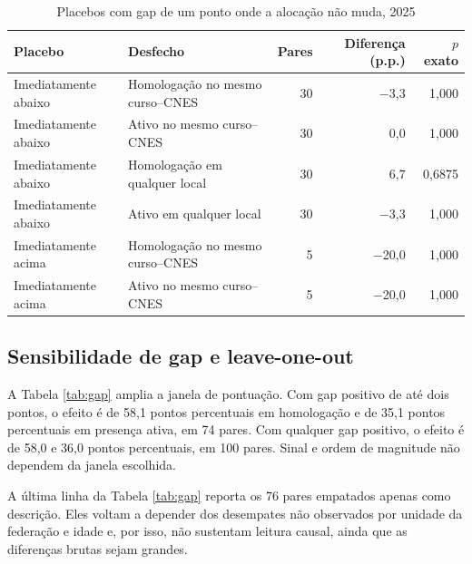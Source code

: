 \documentclass[11pt,a4paper]{article}
\begin{document}
\begin{table}[htbp]
\centering
\small
\caption{Placebos com gap de um ponto onde a alocação não muda, 2025}
\label{tab:placebos}
\begin{tabular}{llrrr}
\toprule
Placebo & Desfecho & Pares & Diferença (p.p.) & $p$ exato \\
\midrule
Imediatamente abaixo & Homologação no mesmo curso--CNES & 30 & $-$3,3 & 1,000 \\
Imediatamente abaixo & Ativo no mesmo curso--CNES & 30 & 0,0 & 1,000 \\
Imediatamente abaixo & Homologação em qualquer local & 30 & 6,7 & 0,6875 \\
Imediatamente abaixo & Ativo em qualquer local & 30 & $-$3,3 & 1,000 \\
Imediatamente acima & Homologação no mesmo curso--CNES & 5 & $-$20,0 & 1,000 \\
Imediatamente acima & Ativo no mesmo curso--CNES & 5 & $-$20,0 & 1,000 \\
\bottomrule
\end{tabular}
\end{table}

\subsection{Sensibilidade de gap e leave-one-out}

A Tabela \ref{tab:gap} amplia a janela de pontuação. Com gap positivo de até dois
pontos, o efeito é de 58,1 pontos percentuais em homologação e de 35,1 pontos
percentuais em presença ativa, em 74 pares. Com qualquer gap positivo, o efeito é
de 58,0 e 36,0 pontos percentuais, em 100 pares. Sinal e ordem de magnitude não
dependem da janela escolhida.

A última linha da Tabela \ref{tab:gap} reporta os 76 pares empatados apenas como
descrição. Eles voltam a depender dos desempates não observados por unidade da
federação e idade e, por isso, não sustentam leitura causal, ainda que as
diferenças brutas sejam grandes.
\end{document}
